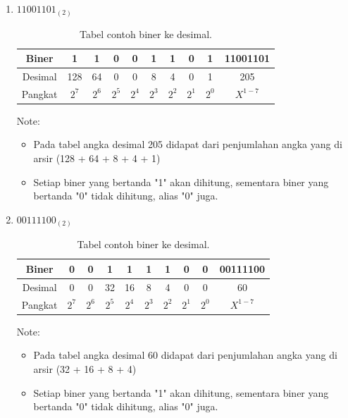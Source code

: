 \begin{enumerate}[label=(\alph*)]
\item $11001101_{(2)}$ 

\begin{table}[h!]
\centering
\begin{tabular}{ |c|c|c|c|c|c|c|c|c|c| } 
\hline
Biner & 1 & 1 & 0 & 0 & 1 & 1 & 0 & 1 & 11001101 \\ 
\hline
Desimal & 128 & 64 & 0 & 0 & 8 & 4 & 0 & 1 & 205 \\ 
\hline
Pangkat & $2^7$ & $2^6$ & $2^5$ & $2^4$ & $2^3$ & $2^2$ & $2^1$ & $2^0$ & $X^{1-7}$ \\ 
\hline
\end{tabular}
\caption{Tabel contoh biner ke desimal.}
\label{table:contoh2}
\end{table}

Note:
\begin{itemize}
\item Pada tabel angka desimal 205 didapat dari penjumlahan angka yang di arsir (128 + 64 + 8 + 4 + 1)
\item Setiap biner yang bertanda "1" akan dihitung, sementara biner yang bertanda "0" tidak dihitung, alias "0" juga.
\end{itemize}

\item $00111100_{(2)}$ 

\begin{table}[h!]
\centering
\begin{tabular}{ |c|c|c|c|c|c|c|c|c|c| } 
\hline
Biner & 0 & 0 & 1 & 1 & 1 & 1 & 0 & 0 & 00111100 \\ 
\hline
Desimal & 0 & 0 & 32 & 16 & 8 & 4 & 0 & 0 & 60 \\ 
\hline
Pangkat & $2^7$ & $2^6$ & $2^5$ & $2^4$ & $2^3$ & $2^2$ & $2^1$ & $2^0$ & $X^{1-7}$ \\ 
\hline
\end{tabular}
\caption{Tabel contoh biner ke desimal.}
\label{table:contoh2}
\end{table}

Note:
\begin{itemize}
\item Pada tabel angka desimal 60 didapat dari penjumlahan angka yang di arsir (32 + 16 + 8 + 4)
\item Setiap biner yang bertanda "1" akan dihitung, sementara biner yang bertanda "0" tidak dihitung, alias "0" juga.
\end{itemize}


\end{enumerate}
